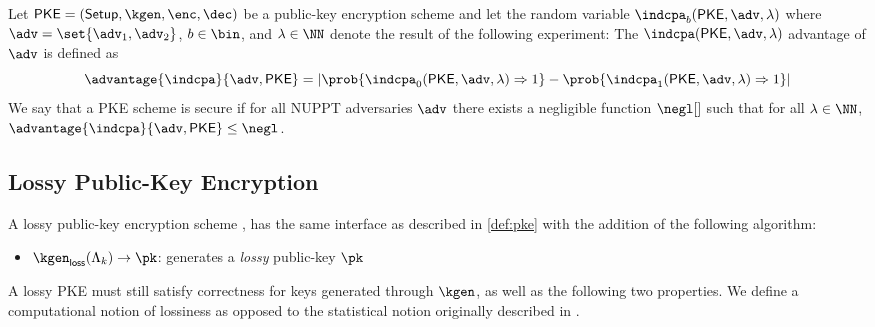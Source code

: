 \begin{definition}[\indcpa]
	Let $\pke = (\setup, \kgen, \enc, \dec)$ be a public-key encryption scheme and let the random variable $\indcpa_b(\pke, \adv, \secpar)$ where $\adv = \set{\adv_1, \adv_2}$, $b \in \bin$, and $\secpar \in \NN$ denote the result of the following experiment:
	The $\indcpa(\pke, \adv, \secpar)$ advantage of $\adv$ is defined as
	$$
		\advantage{\indcpa}{\adv, \pke} = \left|\prob{\indcpa_0(\pke, \adv, \secpar) \Rightarrow 1} - \prob{\indcpa_1(\pke, \adv, \secpar) \Rightarrow 1}\right|
	$$
	We say that a PKE scheme is \indcpa{} secure if for all NUPPT adversaries $\adv$ there exists a negligible function $\negl[]$ such that for all $\secpar \in \NN$, $\advantage{\indcpa}{\adv, \pke} \leq \negl$.
\end{definition}

\subsection{Lossy Public-Key Encryption}

\begin{definition}
	A lossy public-key encryption scheme \cite{C:PeiVaiWat08}, has the same interface as described in \cref{def:pke} with the addition of the following algorithm:
	\begin{itemize}
		\item $\kgenlossy(\pkepp) \rightarrow \pk$: generates a \emph{lossy} public-key $\pk$
	\end{itemize}
\end{definition}

A lossy PKE must still satisfy correctness for keys generated through $\kgen$, as well as the following two properties.
We define a computational notion of lossiness as opposed to the statistical notion originally described in \cite{C:PeiVaiWat08}.

